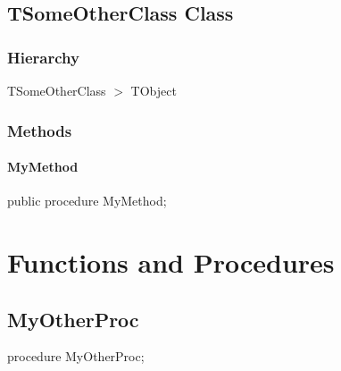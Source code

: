 \documentclass{report}
\begin{document}
\subsection*{TSomeOtherClass Class}
\subsubsection*{\large{\textbf{Hierarchy}}\normalsize\hspace{1ex}\hfill}
TSomeOtherClass {$>$} TObject
\subsubsection*{\large{\textbf{Methods}}\normalsize\hspace{1ex}\hfill}
\paragraph*{MyMethod}\hspace*{\fill}

\begin{list}{}{
\setlength{\itemindent}{0cm}
\setlength{\listparindent}{0cm}
\setlength{\leftmargin}{\evensidemargin}
\addtolength{\leftmargin}{\tmplength}
\settowidth{\labelsep}{X}
\addtolength{\leftmargin}{\labelsep}
\setlength{\labelwidth}{\tmplength}
}
\begin{flushleft}
\item[\textbf{Declaration}\hfill]
\begin{ttfamily}
public procedure MyMethod;\end{ttfamily}


\end{flushleft}
\end{list}
\section{Functions and Procedures}
\subsection*{MyOtherProc}
\begin{list}{}{
\setlength{\itemindent}{0cm}
\setlength{\listparindent}{0cm}
\setlength{\leftmargin}{\evensidemargin}
\addtolength{\leftmargin}{\tmplength}
\settowidth{\labelsep}{X}
\addtolength{\leftmargin}{\labelsep}
\setlength{\labelwidth}{\tmplength}
}
\begin{flushleft}
\item[\textbf{Declaration}\hfill]
\begin{ttfamily}
procedure MyOtherProc;\end{ttfamily}


\end{flushleft}
\end{list}
\end{document}
